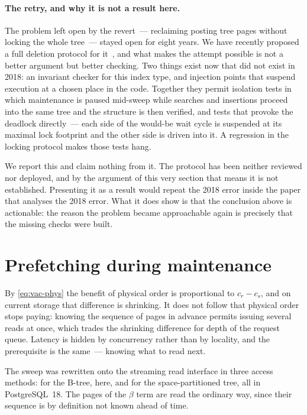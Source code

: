 \paragraph{The retry, and why it is not a result here.} The problem left open by
the revert~--- reclaiming posting tree pages without locking the whole tree~---
stayed open for eight years. We have recently proposed a full deletion protocol
for it~\cite{thread-gin-posting-delete}, and what makes the attempt possible is
not a better argument but better checking. Two things exist now that did not
exist in 2018: an invariant checker for this index type, and injection points
that suspend execution at a chosen place in the code. Together they permit
isolation tests in which maintenance is paused mid-sweep while searches and
insertions proceed into the same tree and the structure is then verified, and
tests that provoke the deadlock directly~--- each side of the would-be wait
cycle is suspended at its maximal lock footprint and the other side is driven
into it. A regression in the locking protocol makes those tests hang.

We report this and claim nothing from it. The protocol has been neither reviewed
nor deployed, and by the argument of this very section that means it is not
established. Presenting it as a result would repeat the 2018 error inside the
paper that analyses the 2018 error. What it does show is that the conclusion
above is actionable: the reason the problem became approachable again is
precisely that the missing checks were built.

\section{Prefetching during maintenance}
\label{sec:prefetch}

By \eqref{eq:vac-phys} the benefit of physical order is proportional to
$c_r - c_s$, and on current storage that difference is shrinking. It does not
follow that physical order stops paying: knowing the sequence of pages in
advance permits issuing several reads at once, which trades the shrinking
difference for depth of the request queue. Latency is hidden by concurrency
rather than by locality, and the prerequisite is the same~--- knowing what to
read next.

The sweep was rewritten onto the streaming read interface in three access
methods:  for the B-tree,  here, and
 for the space-partitioned tree, all in PostgreSQL~18.
The pages of the $\beta$ term are read the ordinary way, since their sequence is
by definition not known ahead of time.

